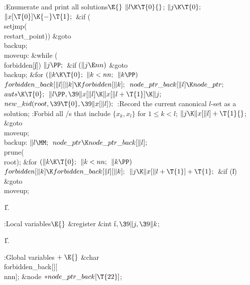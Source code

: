 \Y\B\4:Enumerate and print all solutions\X${}\E{}$\6
$\|l\K\T{0}{}$;\5
${}\|j\K\T{0};{}$\6
${}\|x[\T{0}]\K{-}\T{1};{}$\6
\&{if} (\\{setjmp}(\\{restart\_point}))\1\5
\&{goto} \\{backup};\2\6
\4\\{moveup}:\5
\&{while} (\\{forbidden}[\|j])\1\5
${}\|j\PP;{}$\2\6
\&{if} ${}(\|j\E\\{nn}){}$\1\5
\&{goto} \\{backup};\2\6
\&{for} ${}(\|k\K\T{0};{}$ ${}\|k<\\{nn};{}$ ${}\|k\PP){}$\1\5
${}\\{forbidden\_back}[\|l][\|k]\K\\{forbidden}[\|k];{}$\2\6
${}\\{node\_ptr\_back}[\|l]\K\\{node\_ptr};{}$\6
${}\\{auts}\K\T{0};{}$\6
${}\|l\PP,\39\|x[\|l]\K\|x[\|l+\T{1}]\K\|j;{}$\6
${}\\{new\_kid}(\\{root},\39\T{0},\39\|x[\|l]);{}$\6
:Record the current canonical $l$-set as a solution\X;\6
:Forbid all \SET/s that include $\{x_k,x_l\}$ for $1\le k<l$\X;\6
${}\|j\K\|x[\|l]+\T{1}{}$;\5
\&{goto} \\{moveup};\6
\4\\{backup}:\5
${}\|l\MM;{}$\6
${}\\{node\_ptr}\K\\{node\_ptr\_back}[\|l];{}$\6
\\{prune}(\\{root});\6
\&{for} ${}(\|k\K\T{0};{}$ ${}\|k<\\{nn};{}$ ${}\|k\PP){}$\1\5
${}\\{forbidden}[\|k]\K\\{forbidden\_back}[\|l][\|k];{}$\2\6
${}\|j\K\|x[\|l+\T{1}]+\T{1};{}$\6
\&{if} (\|l)\1\5
\&{goto} \\{moveup};\2\par
\U1.\fi

\B{}:Local variables\X${}\E{}$\6
\&{register} \&{int} \|i${},\39\|j,\39\|k{}$;\par
\U1.\fi

\B{}:Global variables\X${}\mathrel+\E{}$\6
\&{char} \\{forbidden\_back}[][\\{nnn}];\6
\&{node} ${}{*}\\{node\_ptr\_back}[\T{22}]{}$;\par
\fi

